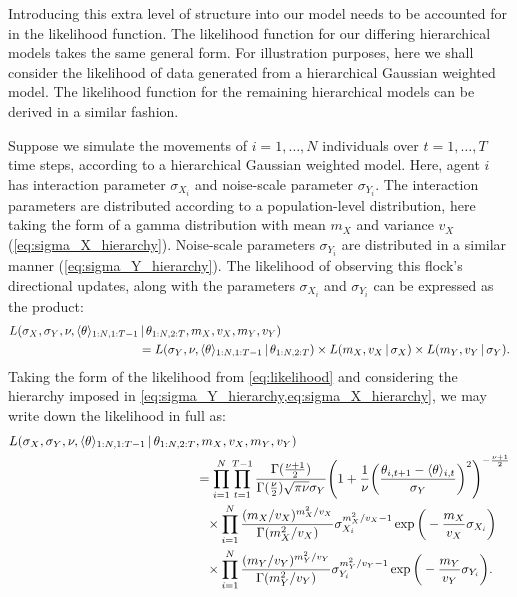 Introducing this extra level of structure into our model needs to be accounted for in the
likelihood function. The likelihood function for our differing hierarchical models takes
the same general form. For illustration purposes, here we shall consider the likelihood of
data generated from a hierarchical Gaussian weighted model. The likelihood function for
the remaining hierarchical models can be derived in a similar fashion.

Suppose we simulate the movements of $i=1,\ldots,N$ individuals over $t=1,\ldots,T$ time
steps, according to a hierarchical Gaussian weighted model. Here, agent $i$ has
interaction parameter $\sigma_{X_i}$ and noise-scale parameter $\sigma_{Y_i}$. The
interaction parameters are distributed according to a population-level distribution, here
taking the form of a gamma distribution with mean $m_X$ and variance $v_X$
(\cref{eq:sigma_X_hierarchy}). Noise-scale parameters $\sigma_{Y_i}$ are distributed in a
similar manner (\cref{eq:sigma_Y_hierarchy}). The likelihood of observing this flock's
directional updates, along with the parameters $\sigma_{X_i}$ and $\sigma_{Y_i}$ can be
expressed as the product:
\begin{align}
  \label{eq:hier_likelihood}
  \begin{split}
      L(\sigma_X, \sigma_Y, \nu, \langle\theta\rangle_{1:N,1:T-1} &\,|\, \theta_{1:N,2:T},
    m_X, v_X, m_Y, v_Y) \\
    &= L(\sigma_Y, \nu, \langle\theta\rangle_{1:N,1:T-1} \,|\, \theta_{1:N,2:T}) \times
    L(m_X, v_X \,|\, \sigma_X)
    \times
    L(m_Y, v_Y \,|\, \sigma_Y).
  \end{split}
\end{align}
Taking the form of the likelihood from \cref{eq:likelihood} and considering the hierarchy
imposed in \cref{eq:sigma_Y_hierarchy,eq:sigma_X_hierarchy}, we may write down the
likelihood in full as:
\begin{align}
  \begin{split}
      L(\sigma_X, \sigma_Y, \nu, \langle\theta\rangle_{1:N,1:T-1} \,|\, \theta_{1:N,2:T}&,
    m_X, v_X, m_Y, v_Y) \\
    &= \prod_{i=1}^N \prod_{t=1}^{T-1}
    \frac{\Gamma(\frac{\nu +1 }{2})}{\Gamma(\frac{\nu}{2})\sqrt{\pi\nu}\sigma_Y}
    \Bigg(1 + \frac{1}{\nu}
    \bigg(\frac{\theta_{i,t+1}-\langle\theta\rangle_{i,t}}{\sigma_Y}\bigg)^2
    \Bigg)^{-\frac{\nu+1}{2}}\\
    &\hphantom{=}\times\prod_{i=1}^N \frac{(m_X / v_X)^{m_X^2 / v_X}}{\Gamma(m_X^2/v_X)}
        \sigma_{X_i}^{m_X^2/v_X - 1} \exp\bigg(-\frac{m_X}{v_X}\sigma_{X_i}\bigg)\\
    &\hphantom{=}\times\prod_{i=1}^N \frac{(m_Y / v_Y)^{m_Y^2 / v_Y}}{\Gamma(m_Y^2/v_Y)}
        \sigma_{Y_i}^{m_Y^2/v_Y - 1} \exp\bigg(-\frac{m_Y}{v_Y}\sigma_{Y_i}\bigg).\\
  \end{split}
\end{align}


